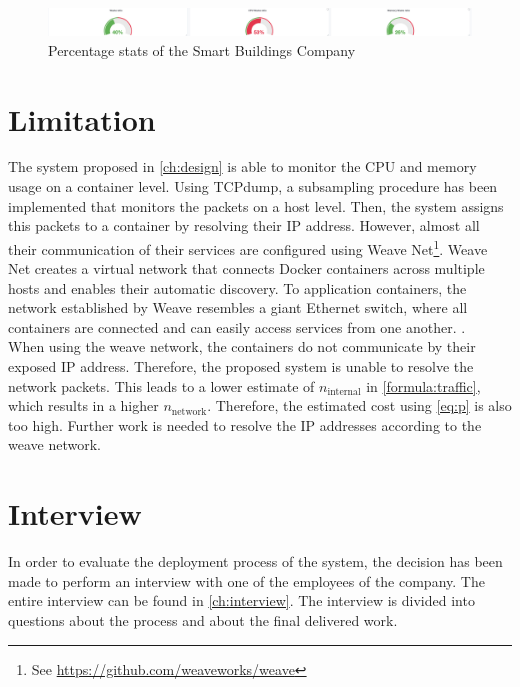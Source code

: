 \begin{figure}
    \centering
    \includegraphics[width=\textwidth]{gfx/stats_percentage.png}
    \caption{Percentage stats of the Smart Buildings Company}
    \label{fig:stats_percentage}
\end{figure}

\section{Limitation} \label{sec:sb-limitation}
The system proposed in \autoref{ch:design} is able to monitor the CPU and memory usage on a container level. Using TCPdump, a subsampling procedure has been implemented that monitors the packets on a host level. Then, the system assigns this packets to a container by resolving their IP address. However, almost all their communication of their services are configured using Weave Net\footnote{See \url{https://github.com/weaveworks/weave}}. Weave Net creates a virtual network that connects Docker containers across multiple hosts and enables their automatic discovery. To application containers, the network established by Weave resembles a giant Ethernet switch, where all containers are connected and can easily access services from one another. \cite{weave}.\\

\noindent
When using the weave network, the containers do not communicate by their exposed IP address. Therefore, the proposed system is unable to resolve the network packets. This leads to a lower estimate of $n_\text{internal}$ in \autoref{formula:traffic}, which results in a higher $n_\text{network}$. Therefore, the estimated cost using \autoref{eq:p} is also too high. Further work is needed to resolve the IP addresses according to the weave network.


\section{Interview} \label{sec:sb-interview}
In order to evaluate the deployment process of the system, the decision has been made to perform an interview with one of the employees of the company. The entire interview can be found in \autoref{ch:interview}. The interview is divided into questions about the process and about the final delivered work.\\

